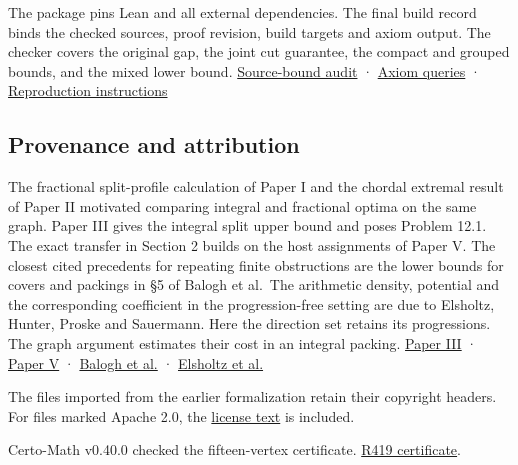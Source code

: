 \documentclass[english,11pt,a4paper]{article}
\begin{document}
The package pins Lean and all external dependencies. The final build record binds the checked sources, proof revision, build targets and axiom output. The checker covers the original gap, the joint cut guarantee, the compact and grouped bounds, and the mixed lower bound. \href{https://github.com/jtraverso/split-clique-partition-gap/blob/main/preprints/SPLITGAP/02_validation/v1.0/lean/status.json}{Source-bound audit} · \href{https://github.com/jtraverso/split-clique-partition-gap/blob/main/preprints/SPLITGAP/02_validation/v1.0/lean/checking-axioms.log}{Axiom queries} · \href{https://github.com/jtraverso/split-clique-partition-gap/blob/main/preprints/SPLITGAP/03_reproducibility/README.md}{Reproduction instructions}

\subsection{Provenance and attribution}\label{provenance-and-attribution}

The fractional split-profile calculation of Paper I and the chordal extremal result of Paper II motivated comparing integral and fractional optima on the same graph. Paper III gives the integral split upper bound and poses Problem 12.1. The exact transfer in Section 2 builds on the host assignments of Paper V. The closest cited precedents for repeating finite obstructions are the lower bounds for covers and packings in §5 of Balogh et al.~The arithmetic density, potential and the corresponding coefficient in the progression-free setting are due to Elsholtz, Hunter, Proske and Sauermann. Here the direction set retains its progressions. The graph argument estimates their cost in an integral packing. \href{https://github.com/jtraverso/erdos-81-chordal-clique-partitions/tree/3cbd90eed41af7e86ac6f1f4b8c796e20a5e661f/preprints/PAPER_III}{Paper III} · \href{https://github.com/jtraverso/erdos-81-chordal-clique-partitions/tree/3cbd90eed41af7e86ac6f1f4b8c796e20a5e661f/preprints/PAPER_V}{Paper V} · \href{https://arxiv.org/html/2412.05522v3}{Balogh et al.} · \href{https://arxiv.org/html/2406.12290v1}{Elsholtz et al.}

The files imported from the earlier formalization retain their copyright headers. For files marked Apache 2.0, the \href{https://github.com/jtraverso/split-clique-partition-gap/blob/main/preprints/SPLITGAP/05_formalization/LICENSE-Apache-2.0.txt}{license text} is included.

Certo-Math v0.40.0 checked the fifteen-vertex certificate. \href{https://github.com/jtraverso/certo-math/blob/0590da36a2af900b9f23d9d292aac62eb6b06ca9/research/R419/NOTE.md}{R419 certificate}.
\end{document}
